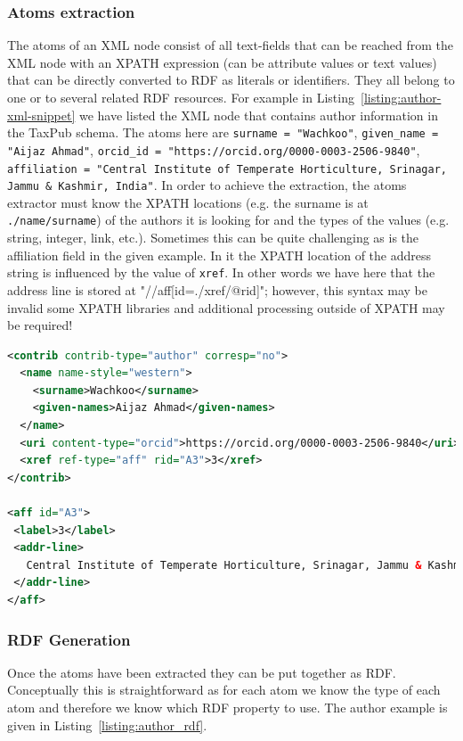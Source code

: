 \subsubsection{Atoms extraction}

The atoms of an XML node consist of all text-fields that can be reached from the XML node with an XPATH expression (can be attribute values or text values) that can be directly converted to RDF as literals or identifiers. They all belong to one or to several related RDF resources. For example in Listing~\ref{listing:author-xml-snippet} we have listed the XML node that contains author information in the TaxPub schema. The atoms here are {\tt surname = "Wachkoo"}, {\tt given\_name = "Aijaz Ahmad"}, {\tt orcid\_id = "https://orcid.org/0000-0003-2506-9840"}, {\tt affiliation = "Central Institute of Temperate Horticulture, Srinagar, Jammu \& Kashmir, India"}. In order to achieve the extraction, the atoms extractor must know the XPATH locations (e.g. the surname is at {\tt ./name/surname}) of the authors it is looking for and the types of the values (e.g. string, integer, link, etc.). Sometimes this can be quite challenging as is the affiliation field in the given example. In it the XPATH location of the address string is influenced by the value of {\tt xref}. In other words we have here that the address line is stored at "{//aff[id=./xref/@rid]}"; however, this syntax may be invalid some XPATH libraries and additional processing outside of XPATH may be required!

\begin{lstlisting}[language=XML,
caption=XML snippet of an author.,
label=listing:author-xml-snippet, basicstyle=\ttfamily\tiny]
<contrib contrib-type="author" corresp="no">
  <name name-style="western">
    <surname>Wachkoo</surname>
    <given-names>Aijaz Ahmad</given-names>
  </name>
  <uri content-type="orcid">https://orcid.org/0000-0003-2506-9840</uri>
  <xref ref-type="aff" rid="A3">3</xref>
</contrib>  

<aff id="A3">
 <label>3</label>
 <addr-line>
   Central Institute of Temperate Horticulture, Srinagar, Jammu & Kashmir, India
 </addr-line>
</aff>
\end{lstlisting}

\subsubsection{RDF Generation}

Once the atoms have been extracted they can be put together as RDF. Conceptually this is straightforward as for each atom we know the type of each atom and therefore we know which RDF property to use. The author example is given in Listing~\ref{listing:author_rdf}.

